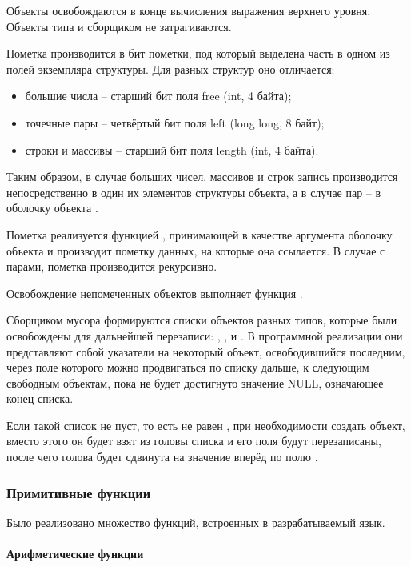Объекты освобождаются в конце вычисления выражения верхнего уровня. Объекты типа  и  сборщиком не затрагиваются.

Пометка производится в бит пометки, под который выделена часть в одном из полей экземпляра структуры. Для разных структур оно отличается:
\begin{itemize}
	\item большие числа -- старший бит поля free (int, 4 байта);
	\item точечные пары -- четвёртый бит поля left (long long, 8 байт);
	\item строки и массивы -- старший бит поля length (int, 4 байта).
\end{itemize}

Таким образом, в случае больших чисел, массивов и строк запись производится непосредственно в один их элементов структуры объекта, а в случае пар -- в оболочку объекта .

Пометка реализуется функцией , принимающей в качестве аргумента оболочку объекта и производит пометку данных, на которые она ссылается. В случае с парами, пометка производится рекурсивно.

Освобождение непомеченных объектов выполняет функция .

Сборщиком мусора формируются списки объектов разных типов, которые были освобождены для дальнейшей перезаписи: , ,  и . В программной реализации они представляют собой указатели на некоторый объект, освободившийся последним, через поле  которого можно продвигаться по списку дальше, к следующим свободным объектам, пока не будет достигнуто значение NULL, означающее конец списка.

Если такой список не пуст, то есть не равен , при необходимости создать объект, вместо этого он будет взят из головы списка и его поля будут перезаписаны, после чего голова будет сдвинута на значение вперёд по полю .



\subsubsection{Примитивные функции}

Было реализовано множество функций, встроенных в разрабатываемый язык.

\paragraph{Арифметические функции}

